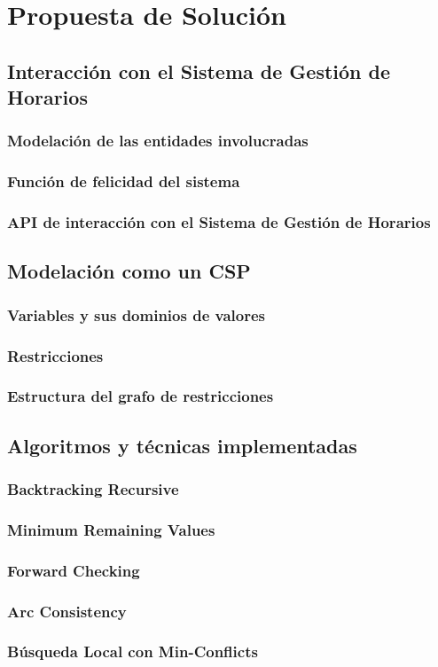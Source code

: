 \chapter{Propuesta de Solución}

\section{Interacci\'on con el Sistema de Gesti\'on de Horarios}

\subsection{Modelaci\'on de las entidades involucradas}

\subsection{Funci\'on de felicidad del sistema}

\subsection{API de interacci\'on con el Sistema de Gesti\'on de Horarios}

\section{Modelaci\'on como un CSP}

\subsection{Variables y sus dominios de valores}

\subsection{Restricciones}

\subsection{Estructura del grafo de restricciones}

\section{Algoritmos y t\'ecnicas implementadas}

\subsection{Backtracking Recursive}

\subsection{Minimum Remaining Values}

\subsection{Forward Checking}

\subsection{Arc Consistency}

\subsection{B\'usqueda Local con Min-Conflicts}
